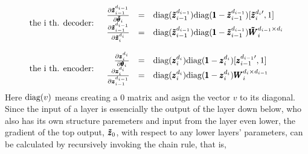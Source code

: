 \begin{equation}\label{eq:GD}
  \begin{split}\
    \begin{array}{rl}
      \textrm{the i th. decoder:} & \begin{array}{rcl}
        \frac{\partial {\pmb{\tilde{z}}_{i-1}^{d_{i-1}}}}{\partial \pmb{\tilde{\theta}}_i} & = & \text{diag}({\pmb{\tilde{z}}_{i-1}^{d_{i-1}}}) \text{diag}(\pmb{1}{} - {\pmb{\tilde{z}}_{i-1}^{d_{i-1}}}) [{\pmb{\tilde{z}}_{i}^{d_{i}\prime}}, 1] \\
        \frac{\partial {\pmb{\tilde{z}}_{i-1}^{d_{i-1}}}}{\partial {\pmb{\tilde{z}}_{i}^{d_{i}}}} & = & \text{diag}({\pmb{\tilde{z}}_{i-1}^{d_{i-1}}}) \text{diag}(\pmb{1}{} - {\pmb{\tilde{z}}_{i-1}^{d_{i-1}}}) \pmb{\tilde{W}}_{i}^{d_{i-1} \times d_{i}} \\
      \end{array} \\ \\
      \textrm{the i th. encoder:} & \begin{array}{rcl}
        \frac{\partial {\pmb{z}_{i}^{d_{i}}}}{\partial \pmb{\theta}_i} & = & \text{diag}({\pmb{z}_{i}^{d_{i}}})\text{diag}(\pmb{1} - {\pmb{z}_{i}^{d_{i}}}) [{\pmb{z}_{i-1}^{d_{i-1}\prime}}, 1] \\
        \frac{\partial {\pmb{z}_{i}^{d_{i}}}}{\partial {\pmb{z}_{i-1}^{d_{i-1}}}} & = &  \text{diag}({\pmb{z}_{i}^{d_{i}}}) \text{diag}(\pmb{1} - {\pmb{z}_{i}^{d_{i}}}) \pmb{W}_{i}^{d_{i} \times d_{i-1}}\\
      \end{array}
    \end{array}
  \end{split}
\end{equation}
Here $\text{diag}(v)$ means creating a $0$ matrix and asign the vector $v$ to its diagonal. Since the input of a layer is essencially the output of the layer down below, who also has its own structure paremeters and input from the layer even lower, the gradient of the top output, $\pmb{\tilde{z}}_0$, with respect to any lower layers' parameters, can be calculated by recursively invoking the chain rule, that is,
